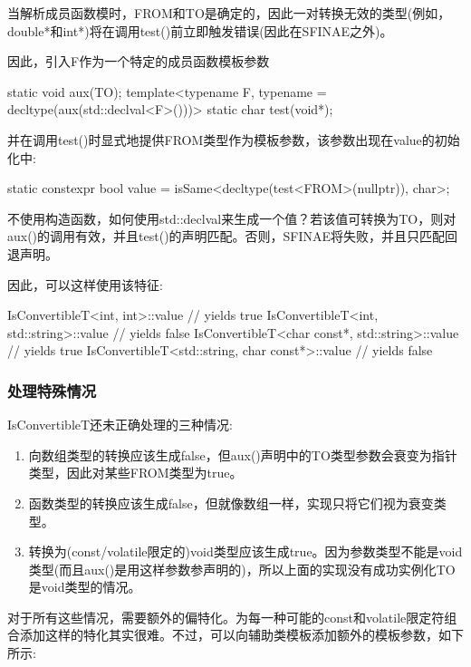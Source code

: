 当解析成员函数模时，FROM和TO是确定的，因此一对转换无效的类型(例如，double*和int*)将在调用test()前立即触发错误(因此在SFINAE之外)。

因此，引入F作为一个特定的成员函数模板参数

\begin{cpp}
static void aux(TO);
template<typename F, typename = decltype(aux(std::declval<F>()))>
	static char test(void*);
\end{cpp}

并在调用test()时显式地提供FROM类型作为模板参数，该参数出现在value的初始化中:

\begin{cpp}
static constexpr bool value
	= isSame<decltype(test<FROM>(nullptr)), char>;
\end{cpp}

不使用构造函数，如何使用std::declval来生成一个值？若该值可转换为TO，则对aux()的调用有效，并且test()的声明匹配。否则，SFINAE将失败，并且只匹配回退声明。

因此，可以这样使用该特征:

\begin{cpp}
IsConvertibleT<int, int>::value // yields true
IsConvertibleT<int, std::string>::value // yields false
IsConvertibleT<char const*, std::string>::value // yields true
IsConvertibleT<std::string, char const*>::value // yields false
\end{cpp}

\subsubsection{处理特殊情况}

IsConvertibleT还未正确处理的三种情况:

\begin{enumerate}
\item
向数组类型的转换应该生成false，但aux()声明中的TO类型参数会衰变为指针类型，因此对某些FROM类型为true。

\item
函数类型的转换应该生成false，但就像数组一样，实现只将它们视为衰变类型。

\item
转换为(const/volatile限定的)void类型应该生成true。因为参数类型不能是void类型(而且aux()是用这样参数参声明的)，所以上面的实现没有成功实例化TO是void类型的情况。
\end{enumerate}

对于所有这些情况，需要额外的偏特化。为每一种可能的const和volatile限定符组合添加这样的特化其实很难。不过，可以向辅助类模板添加额外的模板参数，如下所示:

